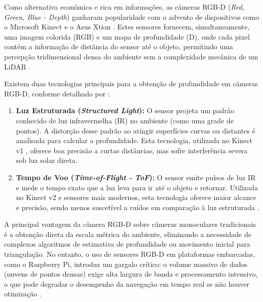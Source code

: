 Como alternativa econômica e rica em informações, as câmeras RGB-D (\textit{Red, Green, Blue - Depth}) ganharam popularidade com o advento de dispositivos como o Microsoft Kinect \cite{microsoft2012kinect_v1} e o Asus Xtion \cite{asus2012xtionpro}. Estes sensores fornecem, simultaneamente, uma imagem colorida (RGB) e um mapa de profundidade (D), onde cada pixel contém a informação de distância do sensor até o objeto, permitindo uma percepção tridimensional densa do ambiente sem a complexidade mecânica de um LiDAR \cite{guapacha2017localizacaomapeamentosimultaneos}.

Existem duas tecnologias principais para a obtenção de profundidade em câmeras RGB-D, conforme detalhado por :

\begin{enumerate}
    \item \textbf{Luz Estruturada (\textit{Structured Light}):} O sensor projeta um padrão conhecido de luz infravermelha (IR) no ambiente (como uma grade de pontos). A distorção desse padrão ao atingir superfícies curvas ou distantes é analisada para calcular a profundidade. Esta tecnologia, utilizada no Kinect v1 \cite{microsoft2012kinect_v1}, oferece boa precisão a curtas distâncias, mas sofre interferência severa sob luz solar direta.
    \item \textbf{Tempo de Voo (\textit{Time-of-Flight - ToF}):} O sensor emite pulsos de luz IR e mede o tempo exato que a luz leva para ir até o objeto e retornar. Utilizada no Kinect v2 \cite{microsoft2014kinect_v2} e sensores mais modernos, esta tecnologia oferece maior alcance e precisão, sendo menos suscetível a ruídos em comparação à luz estruturada \cite{kulkarni2021visualslamcombined}.
\end{enumerate}

A principal vantagem da câmera RGB-D sobre câmeras monoculares tradicionais é a obtenção direta da escala métrica do ambiente, eliminando a necessidade de complexos algoritmos de estimativa de profundidade ou movimento inicial para triangulação. No entanto, o uso de sensores RGB-D em plataformas embarcadas, como o Raspberry Pi, introduz um gargalo crítico: o volume massivo de dados (nuvens de pontos densas) exige alta largura de banda e processamento intensivo, o que pode degradar o desempenho da navegação em tempo real se não houver otimização \cite{gatesichapakorn2019rosbasedautonomous}.

